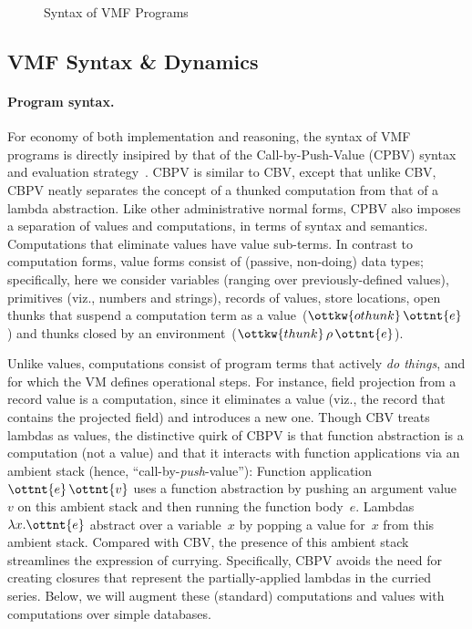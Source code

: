 \begin{figure}
\begin{grammar}
\end{grammar}
\caption{Syntax of VMF Programs}
\label{fig:syntax}
\end{figure}

\subsection{VMF Syntax \& Dynamics}

\paragraph{Program syntax.}
For economy of both implementation and reasoning, the syntax of VMF
programs is directly insipired by that of the Call-by-Push-Value
(CPBV) syntax and evaluation strategy~\cite{CBPV}.
%
CBPV is similar to CBV, except that unlike CBV, CBPV neatly separates
the concept of a thunked computation from that of a lambda
abstraction.
%
Like other administrative normal forms, CPBV also imposes a separation
of values and computations, in terms of syntax and semantics.
%
Computations that eliminate values have value sub-terms.
%
In contrast to computation forms, value forms consist of (passive,
non-doing) data types; specifically, here we consider variables
(ranging over previously-defined values), primitives (viz., numbers
and strings), records of values, store locations, open thunks that
suspend a computation term as a value~($\ottkw{othunk} \, \ottnt{e}$) and thunks
closed by an environment~($\ottkw{thunk} \, \rho \, \ottnt{e}$).

Unlike values, computations consist of program terms that actively
\emph{do things}, and for which the VM defines operational steps. For
instance, field projection from a record value is a computation, since
it eliminates a value (viz., the record that contains the projected
field) and introduces a new one.
%
Though CBV treats lambdas as values, the distinctive quirk of CBPV is
that function abstraction is a computation (not a value) and that it
interacts with function applications via an ambient stack (hence,
``call-by-\emph{push}-value''):
%
Function application~$\ottnt{e} \, \ottnt{v}$ uses a function abstraction by pushing
an argument value~$v$ on this ambient stack and then running the
function body~$e$.
%
Lambdas~$ \lambda  x .  \ottnt{e} $ abstract over a variable~$x$ by popping a value
for~$x$ from this ambient stack.
%
Compared with CBV, the presence of this ambient stack streamlines the
expression of currying.
%
Specifically, CBPV avoids the need for creating closures that
represent the partially-applied lambdas in the curried series.
%
Below, we will augment these (standard) computations and values with
computations over simple databases.

